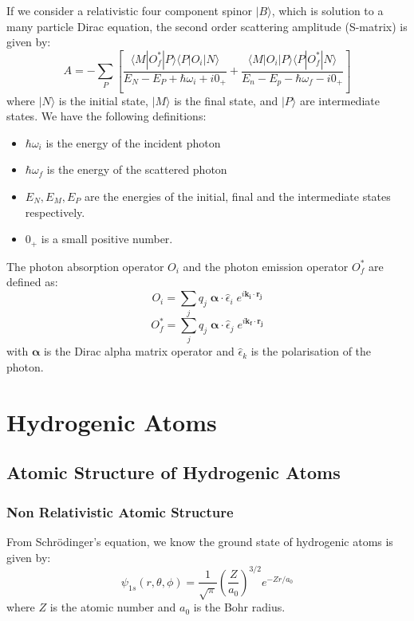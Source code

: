 \documentclass[a4paper,titlepage]{report}
\newcommand{\mb}[1]{\mathbf{#1}}
\newcommand{\ket}[1]{|#1 \rangle}
\newcommand{\bra}[1]{\langle #1|}
\begin{document}
	If we consider a relativistic four component spinor $\ket{B}$, which
	is solution to a many particle Dirac equation, the second order
	scattering amplitude (S-matrix) is given by: 
	\begin{equation}
		A = - \sum_P
			\left[
				\frac{\bra{M} O_f^* \ket{P} \bra{P} O_i \ket{N} }
					 {E_N - E_P + \hbar \omega_i + i0_+}
				+
				\frac{\bra{M} O_i \ket{P} \bra{P} O_f^* \ket{N} }
					 {E_n - E_p - \hbar \omega_f - i0_+}
			\right]
	\end{equation}
	where $\ket{N}$ is the initial state, $\ket{M}$ is the final state,
	and $\ket{P}$ are intermediate states. We have the following
	definitions:
	\begin{itemize}
		\item $\hbar \omega_i$ is the energy of the incident photon
		\item $\hbar \omega_f$ is the energy of the scattered photon
		\item $E_N, E_M, E_P$ are the energies of the initial, final 
			  and the intermediate states respectively.
		\item $0_+$ is a small positive number.			  	
	\end{itemize}
	The photon absorption operator $O_{i}$ and the photon emission
	operator $O_{f}^{*}$ are defined as:
	\begin{equation}
		O_i = \sum_j q_j \; \mb{\alpha} \cdot \hat{\epsilon}_i \;
			  e^{i \mb{k_i} \cdot \mb{r_j} }
	\end{equation}
	\begin{equation}
		O_{f}^{*} = \sum_j q_j \; \mb{\alpha} \cdot \hat{\epsilon}_j \;
			e^{i \mb{k_f} \cdot \mb{r_j} }
	\end{equation}
	with $\mb{\alpha}$ is the Dirac alpha matrix operator and
	$\hat{\epsilon}_k$ is the polarisation of the photon.

\chapter{Hydrogenic Atoms}

\section{Atomic Structure of Hydrogenic Atoms}
	\subsection{Non Relativistic Atomic Structure}
	From Schr\"odinger's equation, we know the ground state of
	hydrogenic atoms is given by:
	\begin{equation} \label{eq:schrodinger-ground}
		\psi_{1s}(r,\theta,\phi) = \frac{1}{\sqrt{\pi}}
								   \left( \frac{Z}{a_0} \right)^{3/2}
								   e^{-Zr/a_0}
	\end{equation}
	where $Z$ is the atomic number and $a_0$ is the Bohr radius.
\end{document}
